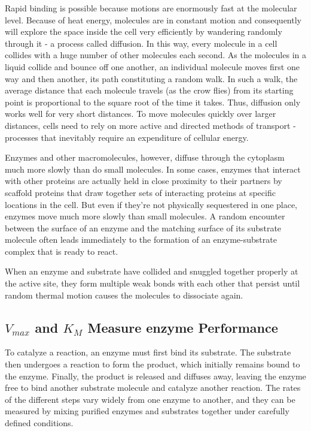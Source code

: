 Rapid binding is possible because motions are enormously fast at the
molecular level. Because of heat energy, molecules are in constant
motion and consequently will explore the space inside the cell very efficiently
by wandering randomly through it - a process called diffusion. In
this way, every molecule in a cell collides with a huge number of other
molecules each second. As the molecules in a liquid collide and bounce
off one another, an individual molecule moves first one way and then
another, its path constituting a random walk. In such a walk,
the average distance that each molecule travels (as the crow flies) from
its starting point is proportional to the square root of the time it takes.
Thus, diffusion only works well for very short distances. To move molecules
quickly over larger distances, cells need to rely on more active
and directed methods of transport - processes that inevitably require an
expenditure of cellular energy.

Enzymes and other macromolecules, however, diffuse through the cytoplasm
much more slowly than do small molecules. In some cases, enzymes
that interact with other proteins are actually held in close proximity to
their partners by scaffold proteins that draw together sets of interacting
proteins at specific locations in the cell. But even if they’re not physically
sequestered in one place, enzymes move much more slowly than
small molecules. A random encounter between the surface of an enzyme and the matching
surface of its substrate molecule often leads immediately to the formation of
an enzyme-substrate complex that is ready to react.

When an enzyme and substrate have collided and snuggled together
properly at the active site, they form multiple weak bonds with each
other that persist until random thermal motion causes the molecules to
dissociate again.

\subsection{$V_{max}$ and $K_{M}$ Measure enzyme Performance}

To catalyze a reaction, an enzyme must first bind its substrate. The substrate
then undergoes a reaction to form the product, which initially
remains bound to the enzyme. Finally, the product is released and diffuses
away, leaving the enzyme free to bind another substrate molecule
and catalyze another reaction. The rates of the different
steps vary widely from one enzyme to another, and they can be measured
by mixing purified enzymes and substrates together under carefully
defined conditions.

